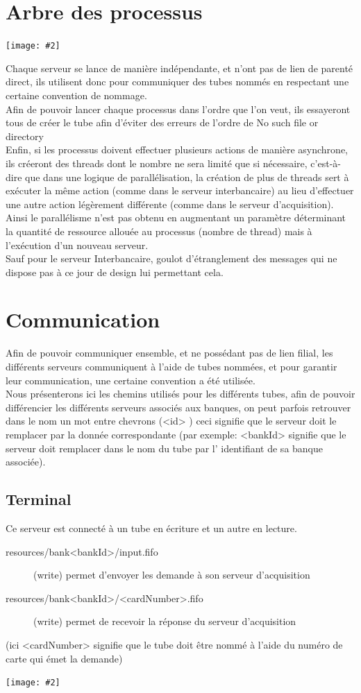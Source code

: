 \documentclass[french, a4paper, 12pt, titlepage]{article}
\newcommand{\graph}[2]{
\medskip
	\begin{center}
		\texttt{[image: \#2]}
	\end{center}
\medskip
}
\begin{document}
\section{Arbre des processus}
\graph{0.6}{arbre}
Chaque serveur se lance de manière indépendante, et n'ont pas de lien de parenté direct, ils utilisent donc pour communiquer des tubes nommés en respectant une certaine convention de nommage.\\
\noindent
Afin de pouvoir lancer chaque processus dans l'ordre que l'on veut, ils essayeront tous de créer le tube afin d'éviter des erreurs de l'ordre de \og No such file or directory \fg\\
\noindent
Enfin, si les processus doivent effectuer plusieurs actions de manière asynchrone, ils créeront des threads dont le nombre ne sera limité que si nécessaire,
c'est-à-dire que dans une logique de parallélisation, la création de plus de threads sert à exécuter la même action (comme dans le serveur interbancaire) au lieu d'effectuer une autre action légèrement différente (comme dans le serveur d'acquisition).\\
\noindent
Ainsi le parallélisme n'est pas obtenu en augmentant un paramètre déterminant la quantité de ressource allouée au processus (nombre de thread) mais à l'exécution d'un nouveau serveur.\\
\noindent
Sauf pour le serveur Interbancaire, goulot d'étranglement des messages qui ne dispose pas à ce jour de design lui permettant cela.


\section{Communication}
Afin de pouvoir communiquer ensemble, et ne possédant pas de lien filial, les différents serveurs communiquent à l'aide de tubes nommées, et pour garantir leur communication, une certaine convention a été utilisée.\\
\noindent
Nous présenterons ici les chemins utilisés pour les différents tubes, afin de pouvoir différencier les différents serveurs associés aux banques, on peut parfois retrouver dans le nom un mot entre chevrons (\og <id> \fg) ceci signifie que le serveur doit le remplacer par la donnée correspondante (par exemple: <bankId> signifie que le serveur doit remplacer dans le nom du tube par l' identifiant de sa banque associée).

\subsection{Terminal}
Ce serveur est connecté à un tube en écriture et un autre en lecture.
\begin{description}
	\item[resources/bank<bankId>/input.fifo] (write) permet d'envoyer les demande à son serveur d'acquisition
	\item[resources/bank<bankId>/<cardNumber>.fifo] (write) permet de recevoir la réponse du serveur d'acquisition
\end{description}
\noindent
(ici <cardNumber> signifie que le tube doit être nommé à l'aide du numéro de carte qui émet la demande)
\graph{0.5}{terminal}
\end{document}
